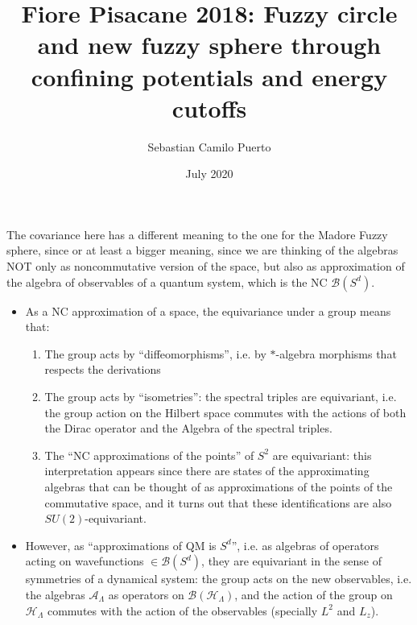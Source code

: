 \documentclass{article}
\title{Fiore Pisacane 2018: Fuzzy circle and new fuzzy sphere through confining potentials and energy cutoffs}
\author{Sebastian Camilo Puerto}
\date{July 2020}
\begin{document}
\maketitle

\tableofcontents

The covariance here has a different meaning to the one for the Madore Fuzzy sphere, since or at least a bigger meaning, since we are thinking of the algebras NOT only as noncommutative version of the space, but also as approximation of the algebra of observables of a quantum system, which is the NC $\mathcal B(S^d)$.
    \begin{itemize}
        
    \item As a NC approximation of a space, the equivariance under a group means that: 
    
        \begin{enumerate}
        
        \item The group acts by ``diffeomorphisms'', i.e. by $*$-algebra morphisms %
        that respects the derivations
        
        \item The group acts by ``isometries'': the spectral triples are equivariant, i.e. the group action on the Hilbert space commutes with the actions of both the Dirac operator and the Algebra of the spectral triples.
        
        \item The ``NC approximations of the points'' of $S^2$ are equivariant: this interpretation appears since there are states of the approximating algebras that can be thought of as approximations of the points of the commutative space, and it turns out that these identifications are also $SU(2)$-equivariant.
        
        \end{enumerate}
    
    \item However, as ``approximations of QM is $S^d$'', i.e. as algebras of operators acting on wavefunctions $\in \mathcal B(S^d)$, they are equivariant in the sense of symmetries of a dynamical system: the group acts on the new observables, i.e. the algebras $\mathcal A_\Lambda$ as operators on $\mathcal B(\mathcal H_\Lambda)$, and the action of the group on $\mathcal H_\Lambda$ commutes with the action of the observables (specially $L^2$ and $L_z$). 
    
        \begin{itemize}
            

\end{itemize}
\end{itemize}
\end{document}
